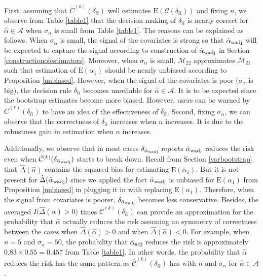 \documentclass[11pt]{article}
\def\mc#1{\mathcal{#1}} %
\def\E#1{\mathrm{E}(#1)} %
\theoremstyle{definition}
\begin{document}
First, assuming that $\bar{C}^{(k)}(\delta_{\hat{\alpha}})$ well estimates $\E{\mc{C}(\delta_{\hat{\alpha}}})$ and fixing $n$, we  observe from Table \ref{table1} that the decision making of $\delta_{\hat{\alpha}}$ is nearly correct  for $\hat{\alpha}\in \mc{A}$ when $\sigma_{\alpha}$ is small  from Table \ref{table1}. The reasons can be explained as follows. When $\sigma_{\alpha}$ is small, the signal of the covariates is strong so that $\hat{\alpha}_{\rm wadj}$ will be expected to capture the signal according to construction of $\hat{\alpha}_{\rm wadj}$ in Section \ref{constructionofestimators}. Moreover, when $\sigma_{\alpha}$ is small, $\mc{M}_{22}$ approximates $\mc{M}_{21}$ such that estimation of $\E{\alpha_1}$ should be nearly unbiased according to Proposition \ref{unbiased}. However, when the signal of the covariates is poor ($\sigma_{\alpha}$ is big), the decision rule $\delta_{\hat{\alpha}}$  becomes unreliable for $\hat{\alpha}\in \mc{A}$. It is to be expected since the bootstrap estimates become more biased. However, users can be warned by $\bar{C}^{(k)}(\delta_{\hat{\alpha}})$ to have an idea of the effectiveness of $\delta_{\hat{\alpha}}$. Second, fixing $\sigma_{\alpha}$, we can observe that the correctness of $\delta_{\hat{\alpha}}$ increases when $n$ increases. It is due to the robustness gain in estimation when $n$ increases.  


Additionally, we  observe that in most cases $\delta_{\hat{\alpha}_{\rm wadj}}$ reports $\hat{\alpha}_{\rm wadj}$ reduces the risk even when $\bar{\mc{C}}^{(k)}(\delta_{\hat{\alpha}_{\rm wadj}})$ starts to break down.  Recall from Section \ref{varbootstrap} that $\hat{\Delta}(\hat{\alpha})$ contains the squared bias for estimating $\E{\alpha_1}$. But it is not present for $\hat{\Delta}(\hat{\alpha}_{\rm wadj})$ since we applied the fact  $\hat{\alpha}_{\rm wadj}$ is unbiased for $\E{\alpha_1}$ from Proposition \ref{unbiased} in plugging it in with replacing $\E{\alpha_1}$. Therefore, when the signal from covariates is poorer, $\delta_{\hat{\alpha}_{\rm wadj}}$ becomes less conservative. Besides, the averaged $I\big(\hat{\Delta}(\hat{\alpha})>0\big)$ times $\bar{\mc{C}}^{(k)}(\delta_{\hat{\alpha}})$ can provide an approximation for the probability that $\hat{\alpha}$ actually reduces the risk assuming an symmetry of correctness between the cases when $\hat{\Delta}(\hat{\alpha})>0$ and when $\hat{\Delta}(\hat{\alpha})<0$. For example, when $n = 5$ and $\sigma_{\alpha}=50$, the probability that $\hat{\alpha}_{\rm adj}$ reduces the risk is approximately $0.83 \times 0.55 = 0.457$ from Table \ref{table1}.  In other words,  the probability that $\hat{\alpha}$ reduces the risk has the same pattern as $\bar{\mc{C}}^{(k)}(\delta_{\hat{\alpha}})$ has with $n$ and $\sigma_{\alpha}$ for $\hat{\alpha}\in \mc{A}$.
\end{document}
